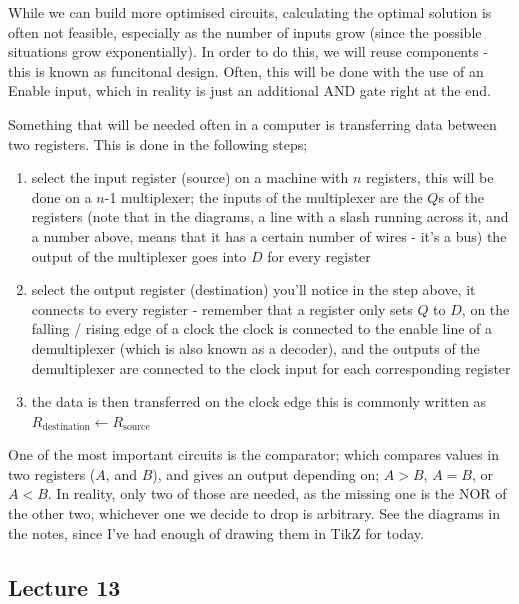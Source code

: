 \documentclass[a4paper, 12pt]{article}
\begin{document}
            While we can build more optimised circuits, calculating the optimal solution is often not feasible, especially as the number of inputs grow (since the possible situations grow exponentially). In order to do this, we will reuse components - this is known as funcitonal design. Often, this will be done with the use of an Enable input, which in reality is just an additional AND gate right at the end.
            \medskip

            Something that will be needed often in a computer is transferring data between two registers. This is done in the following steps;
            \begin{enumerate}[1.]
                \itemsep0em
                \item select the input register (source)
                    \subitem on a machine with $n$ registers, this will be done on a $n$-1 multiplexer; the inputs of the multiplexer are the $Q$s of the registers (note that in the diagrams, a line with a slash running across it, and a number above, means that it has a certain number of wires - it's a bus)
                    \subitem the output of the multiplexer goes into $D$ for every register
                \item select the output register (destination)
                    \subitem you'll notice in the step above, it connects to every register - remember that a register only sets $Q$ to $D$, on the falling / rising edge of a clock
                    \subitem the clock is connected to the enable line of a demultiplexer (which is also known as a decoder), and the outputs of the demultiplexer are connected to the clock input for each corresponding register
                \item the data is then transferred on the clock edge
                    \subitem this is commonly written as $R_\text{destination} \leftarrow R_\text{source}$
            \end{enumerate}
            One of the most important circuits is the comparator; which compares values in two registers ($A$, and $B$), and gives an output depending on; $A > B$, $A = B$, or $A < B$. In reality, only two of those are needed, as the missing one is the NOR of the other two, whichever one we decide to drop is arbitrary. See the diagrams in the notes, since I've had enough of drawing them in TikZ for today.
        \subsection*{Lecture 13}
\end{document}

